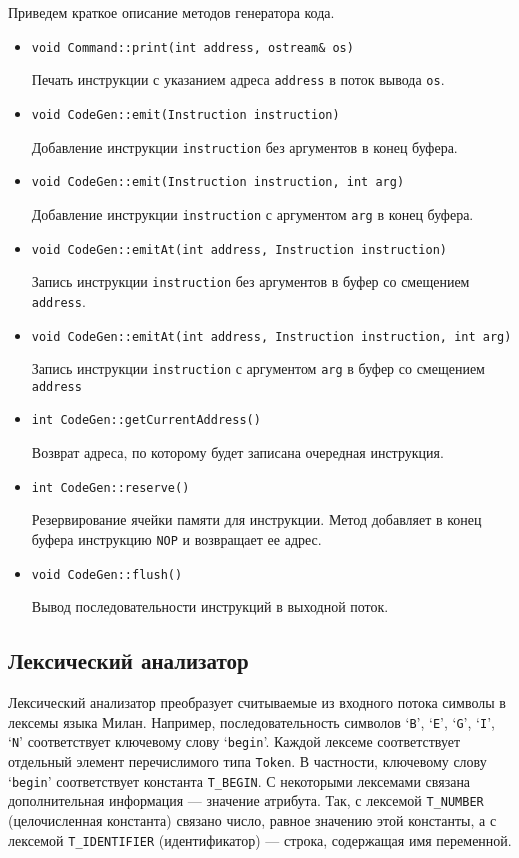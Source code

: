 \documentclass[a4paper,12pt]{article}
\begin{document}
Приведем краткое описание методов генератора кода.
\begin{itemize}
\item \texttt{void Command::print(int address, ostream\& os)}

      Печать инструкции с указанием адреса \texttt{address} в поток вывода \texttt{os}.

\item \texttt{void CodeGen::emit(Instruction instruction)}

      Добавление инструкции \texttt{instruction} без аргументов в конец буфера.

\item \texttt{void CodeGen::emit(Instruction instruction, int arg)}

      Добавление инструкции \texttt{instruction} с аргументом \texttt{arg} в конец буфера.

\item \texttt{void CodeGen::emitAt(int address, Instruction instruction)}

      Запись инструкции \texttt{instruction} без аргументов в буфер со смещением
      \texttt{address}.

\item \texttt{void CodeGen::emitAt(int address, Instruction instruction, int
arg)}

      Запись инструкции \texttt{instruction} с аргументом \texttt{arg} в буфер
      со смещением \texttt{address}

\item \texttt{int CodeGen::getCurrentAddress()}

      Возврат адреса, по которому будет записана очередная инструкция.

\item \texttt{int CodeGen::reserve()}

      Резервирование ячейки памяти для инструкции. Метод добавляет в конец
      буфера инструкцию \texttt{NOP} и возвращает ее адрес.

\item \texttt{void CodeGen::flush()}

      Вывод последовательности инструкций в выходной поток.
\end{itemize}

\subsection{Лексический анализатор}

Лексический анализатор преобразует считываемые из входного потока символы в
лексемы языка Милан. Например, последовательность символов `\texttt{B}',
`\texttt{E}', `\texttt{G}', `\texttt{I}', `\texttt{N}' соответствует ключевому
слову `\texttt{begin}'. Каждой лексеме соответствует отдельный элемент
перечислимого типа \texttt{Token}. В частности, ключевому слову `\texttt{begin}'
соответствует константа \texttt{T\_BEGIN}. С некоторыми лексемами связана
дополнительная информация --- значение атрибута. Так, с лексемой
\texttt{T\_NUMBER} (целочисленная константа) связано число, равное значению этой
константы, а с лексемой \texttt{T\_IDENTIFIER} (идентификатор) --- строка,
содержащая имя переменной.
\end{document}
